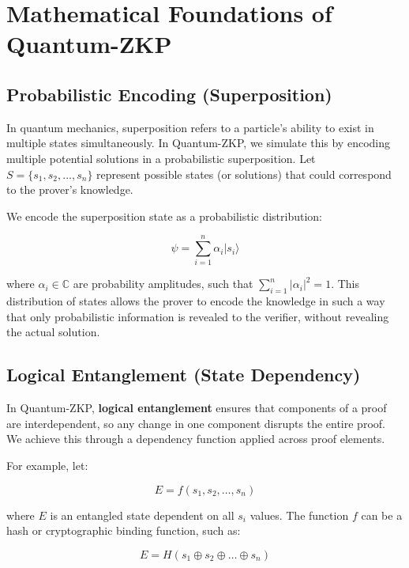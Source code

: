 \documentclass{article.cls}
\begin{document}
\section{Mathematical Foundations of Quantum-ZKP}

\subsection{Probabilistic Encoding (Superposition)}
In quantum mechanics, superposition refers to a particle’s ability to exist in multiple states simultaneously. In Quantum-ZKP, we simulate this by encoding multiple potential solutions in a probabilistic superposition. Let $S = \{s_1, s_2, \dots, s_n\}$ represent possible states (or solutions) that could correspond to the prover's knowledge.

We encode the superposition state as a probabilistic distribution:

\begin{equation}
\psi = \sum_{i=1}^n \alpha_i \vert s_i \rangle
\end{equation}

where $\alpha_i \in \mathbb{C}$ are probability amplitudes, such that $\sum_{i=1}^n \vert \alpha_i \vert^2 = 1$. This distribution of states allows the prover to encode the knowledge in such a way that only probabilistic information is revealed to the verifier, without revealing the actual solution.

\subsection{Logical Entanglement (State Dependency)}
In Quantum-ZKP, \textbf{logical entanglement} ensures that components of a proof are interdependent, so any change in one component disrupts the entire proof. We achieve this through a dependency function applied across proof elements.

For example, let:

\begin{equation}
E = f(s_1, s_2, \dots, s_n)
\end{equation}

where $E$ is an entangled state dependent on all $s_i$ values. The function $f$ can be a hash or cryptographic binding function, such as:

\begin{equation}
E = H(s_1 \oplus s_2 \oplus \dots \oplus s_n)
\end{equation}
\end{document}
